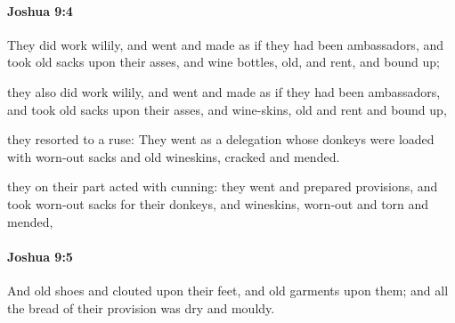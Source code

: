 		\paragraph{Joshua 9:4} %
			\label{JOSHUA-9-4}

			They did work wilily, and went and made as if they had been ambassadors, and took old sacks upon their asses, and wine bottles, old, and rent, and bound up;

			\begin{versebox}
					\item[BHS] 
					\item[ASV] they also did work wilily, and went and made as if they had been ambassadors, and took old sacks upon their asses, and wine-skins, old and rent and bound up,
					\item[NIV] they resorted to a ruse: They went as a delegation whose donkeys were loaded with worn-out sacks and old wineskins, cracked and mended.
					\item[NRSV] they on their part acted with cunning: they went and prepared provisions, and took worn-out sacks for their donkeys, and wineskins, worn-out and torn and mended,
			\end{versebox}

		\paragraph{Joshua 9:5} %
			\label{JOSHUA-9-5}

			And old shoes and clouted upon their feet, and old garments upon them; and all the bread of their provision was dry and mouldy.


